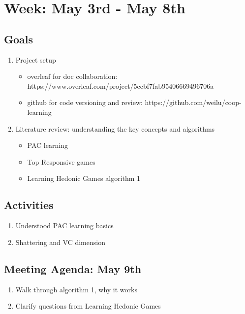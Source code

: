 \documentclass[a4paper]{article}
\begin{document}
\section*{Week: May 3rd - May 8th}

\subsection*{Goals}

\begin{enumerate}
  \item Project setup
  \begin{itemize}
    \item overleaf for doc collaboration: https://www.overleaf.com/project/5ccbf7fab95406669496706a
    \item github for code versioning and review: https://github.com/weilu/coop-learning
  \end{itemize}

  \item Literature review: understanding the key concepts and algorithms
  \begin{itemize}
    \item PAC learning
    \item Top Responsive games
    \item Learning Hedonic Games \cite{ijcai2017-380} algorithm 1
  \end{itemize}

\end{enumerate}

\subsection*{Activities}

\begin{enumerate}
  \item Understood PAC learning basics \cite{Valiant:1984:TL:1968.1972}
  \item Shattering and VC dimension \cite{vc}
\end{enumerate}

\subsection*{Meeting Agenda: May 9th}

\begin{enumerate}
  \item Walk through algorithm 1, why it works
  \item Clarify questions from Learning Hedonic Games \cite{ijcai2017-380}
\end{enumerate}

\end{document}
